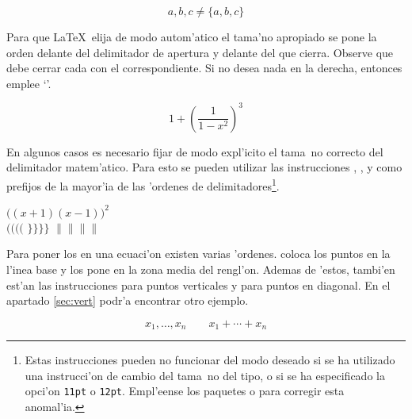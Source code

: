 \begin{example}
\begin{displaymath}
{a,b,c}\neq\{a,b,c\}
\end{displaymath}
\end{example}

Para que \LaTeX\ elija de modo autom'atico el tama'no apropiado se
pone la orden  delante del delimitador de apertura y
 delante del que cierra. Observe que debe cerrar cada
 con el  correspondiente. Si no desea nada en la
derecha, entonces emplee `'.


\begin{example}
\begin{displaymath}
1 + \left( \frac{1}{ 1-x^{2} }
    \right) ^3
\end{displaymath}
\end{example}


En algunos casos es necesario fijar de modo expl'icito el tama~no
correcto del delimitador matem'atico.
Para esto se pueden utilizar las instrucciones , ,
 y  como prefijos de la mayor'ia de las 'ordenes de
delimitadores\footnote{Estas instrucciones pueden no funcionar del
  modo deseado si se ha utilizado una instrucci'on de cambio del
  tama~no del tipo, o si se ha especificado la opci'on \texttt{11pt} o
  \texttt{12pt}. Empl'eense los paquetes  o 
  para corregir esta anomal'ia.}.

\begin{example}
$\Big( (x+1) (x-1) \Big) ^{2}$\\
$\big(\Big(\bigg(\Bigg($\quad
$\big\}\Big\}\bigg\}\Bigg\}$\quad
$\big\|\Big\|\bigg\|\Bigg\|$
\end{example}

Para poner los \textbf{} en una ecuaci'on existen
varias 'ordenes.  coloca los puntos en la l'inea base y
 los pone en la zona media del rengl'on. Ademas de 'estos,
tambi'en est'an las instrucciones  para puntos verticales y
 para puntos en diagonal.
%
%
%
En el apartado \ref{sec:vert} podr'a encontrar otro ejemplo.

\begin{example}
\begin{displaymath}
x_{1},\ldots,x_{n} \qquad
x_{1}+\cdots+x_{n}
\end{displaymath}
\end{example}
 
